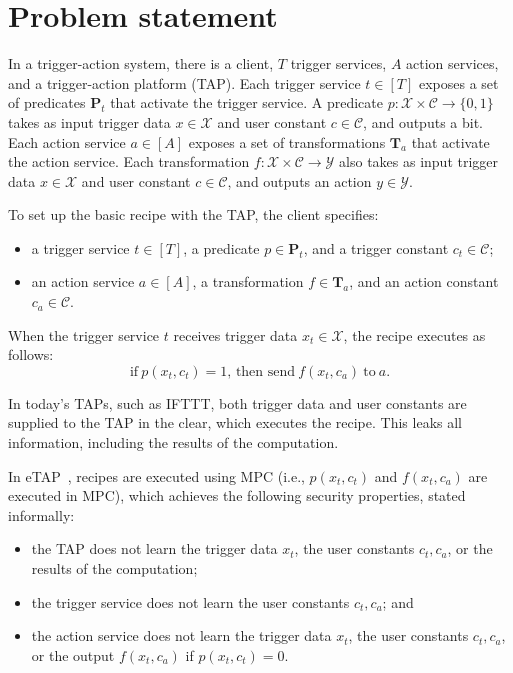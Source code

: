 \section{Problem statement}
\label{sec:problem}

In a trigger-action system, there is a client, $T$ trigger services, $A$ action
services, and a trigger-action platform (TAP). Each trigger service $t \in [T]$
exposes a set of predicates $\mathbf{P}_t$ that activate the trigger service. A
predicate $p : \mathcal{X} \times \mathcal{C} \to \{0,1\}$ takes as input
trigger data $x \in \mathcal{X}$ and user constant $c \in \mathcal{C}$, and
outputs a bit. Each action service $a \in [A]$ exposes a set of transformations
$\mathbf{T}_a$ that activate the action service. Each transformation $f :
\mathcal{X} \times \mathcal{C} \to \mathcal{Y}$ also takes as input trigger data
$x \in \mathcal{X}$ and user constant $c \in \mathcal{C}$, and outputs an action
$y \in \mathcal{Y}$.

To set up the basic recipe with the TAP, the client specifies:
\begin{itemize}
  \item a trigger service $t \in [T]$, a predicate $p \in \mathbf{P}_t$, and a
    trigger constant $c_t \in \mathcal{C}$;
  \item an action service $a \in [A]$, a transformation $f \in \mathbf{T}_a$,
    and an action constant $c_a \in \mathcal{C}$.
\end{itemize}
When the trigger service $t$ receives trigger data $x_t \in \mathcal{X}$, the
recipe executes as follows:
\[
  \text{if}~p(x_t, c_t) = 1\text{, then send}~f(x_t, c_a)~\text{to}~a.
\]

In today's TAPs, such as IFTTT, both trigger data and user constants are
supplied to the TAP in the clear, which executes the recipe. This leaks all
information, including the results of the computation.

In \textsf{eTAP}~\cite{DBLP:conf/sp/ChenCWSCF21}, recipes are executed using MPC
(i.e., $p(x_t, c_t)$ and $f(x_t, c_a)$ are executed in MPC), which achieves the
following security properties, stated informally:
\begin{itemize}
  \item the TAP does not learn the trigger data $x_t$, the user constants $c_t,
    c_a$, or the results of the computation;
  \item the trigger service does not learn the user constants $c_t, c_a$; and
  \item the action service does not learn the trigger data $x_t$, the user
    constants $c_t, c_a$, or the output $f(x_t, c_a)$ if $p(x_t, c_t) = 0$.
\end{itemize}

